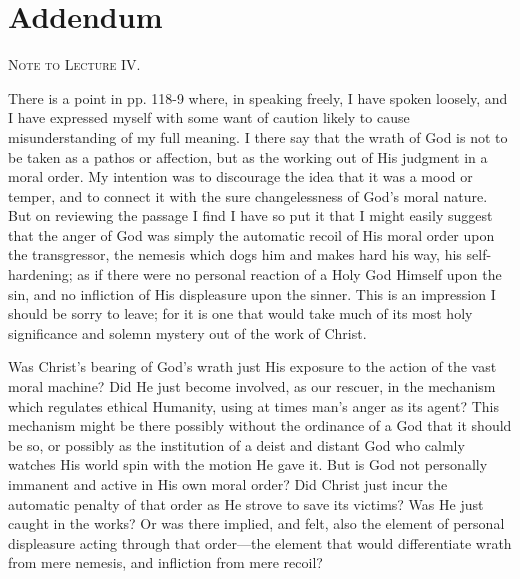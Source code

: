 \documentclass[12pt,a5paper,twoside,titlepage]{book}
\begin{document}
\backmatter

\chapter{Addendum} 



\begin{center}
\textsc{Note to Lecture IV.} 
\end{center}

There is a point in pp. 118-9 where, in speaking freely, 
I have spoken loosely, and I have expressed myself with 
some want of caution likely to cause misunderstanding 
of my full meaning. I there say that the wrath of God 
is not to be taken as a pathos or affection, but as the 
working out of His judgment in a moral order. My 
intention was to discourage the idea that it was a 
mood or temper, and to connect it with the sure changelessness 
of God's moral nature. But on reviewing the 
passage I find I have so put it that I might easily suggest 
that the anger of God was simply the automatic recoil 
of His moral order upon the transgressor, the nemesis 
which dogs him and makes hard his way, his self-hardening; 
as if there were no personal reaction of a Holy God 
Himself upon the sin, and no infliction of His displeasure 
upon the sinner. This is an impression I should be sorry 
to leave; for it is one that would take much of its most 
holy significance and solemn mystery out of the work of 
Christ. 

Was Christ's bearing of God's wrath just His exposure 
to the action of the vast moral machine? Did He just 
become involved, as our rescuer, in the mechanism which 
regulates ethical Humanity, using at times man's anger as 
its agent? This mechanism might be there possibly without 
the ordinance of a God that it should be so, or possibly 
as the institution of a deist and distant God who calmly 
watches His world spin with the motion He gave it. But 
is God not personally immanent and active in His own 
moral order? Did Christ just incur the automatic penalty 
of that order as He strove to save its victims? Was He 
just caught in the works? Or was there implied, and 
felt, also the element of personal displeasure acting 
through that order---the element that would differentiate 
wrath from mere nemesis, and infliction from mere recoil? 
\end{document}
